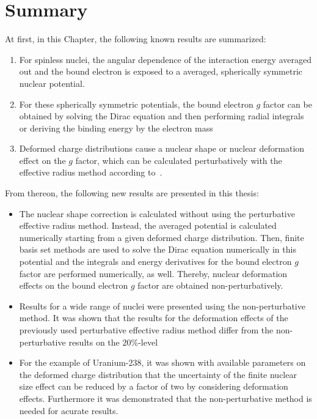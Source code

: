 \section{Summary}
At first, in this Chapter, the following known results are summarized:
\begin{enumerate}
\item For spinless nuclei, the angular dependence of the interaction energy averaged out and the bound electron is exposed to a averaged, spherically symmetric nuclear potential.
\item For these spherically symmetric potentials, the bound electron $g$ factor can be obtained by solving the Dirac equation and then performing radial integrals or deriving the binding energy by the electron mass
\item Deformed charge distributions cause a nuclear shape or nuclear deformation effect on the $g$ factor, which can be calculated perturbatively with the effective radius method according to~\cite{jacek2012}.
\end{enumerate}
From thereon, the following new results are presented in this thesis:
\begin{itemize}
\item The nuclear shape correction is calculated without using the perturbative effective radius method. Instead, the averaged potential is calculated numerically starting from a given deformed charge distribution. Then, finite basis set methods are used to solve the Dirac equation numerically in this potential and the integrals and energy derivatives for the bound electron $g$ factor are performed numerically, as well. Thereby, nuclear deformation effects on the bound electron $g$ factor are obtained non-perturbatively.
\item Results for a wide range of nuclei were presented using the non-perturbative method. It was shown that the results for the deformation effects of the previously used perturbative effective radius method differ from the non-perturbative results on the $20\%$-level
\item For the example of Uranium-238, it was shown with available parameters on the deformed charge distribution that the uncertainty of the finite nuclear size effect can be reduced by a factor of two by considering deformation effects. Furthermore it was demonstrated that the non-perturbative method is needed for acurate results.
\end{itemize}

